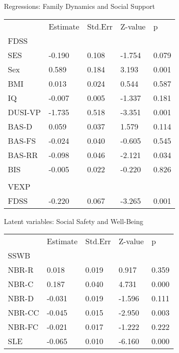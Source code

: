 \documentclass[utf8]{frontiersSCNS} %
\begin{document}
Regressions: Family Dynamics and Social Support
\begin{table}[]
\begin{tabular}{lllll}
        & Estimate & Std.Err & Z-value & p     \\
FDSS    &          &         &         &       \\
SES     & -0.190   & 0.108   & -1.754  & 0.079 \\
Sex     & 0.589    & 0.184   & 3.193   & 0.001 \\
BMI     & 0.013    & 0.024   & 0.544   & 0.587 \\
IQ      & -0.007   & 0.005   & -1.337  & 0.181 \\
DUSI-VP & -1.735   & 0.518   & -3.351  & 0.001 \\
BAS-D   & 0.059    & 0.037   & 1.579   & 0.114 \\
BAS-FS  & -0.024   & 0.040   & -0.605  & 0.545 \\
BAS-RR  & -0.098   & 0.046   & -2.121  & 0.034 \\
BIS     & -0.005   & 0.022   & -0.220  & 0.826 \\
        &          &         &         &       \\
VEXP    &          &         &         &       \\
FDSS    & -0.220   & 0.067   & -3.265  & 0.001
\end{tabular}
\end{table}


Latent variables: Social Safety and Well-Being
\begin{table}[]
\begin{tabular}{lllll}
       & Estimate & Std.Err & Z-value & p     \\
SSWB   &          &         &         &       \\
NBR-R  & 0.018    & 0.019   & 0.917   & 0.359 \\
NBR-C  & 0.187    & 0.040   & 4.731   & 0.000 \\
NBR-D  & -0.031   & 0.019   & -1.596  & 0.111 \\
NBR-CC & -0.045   & 0.015   & -2.950  & 0.003 \\
NBR-FC & -0.021   & 0.017   & -1.222  & 0.222 \\
SLE    & -0.065   & 0.010   & -6.160  & 0.000
\end{tabular}
\end{table}
\end{document}
